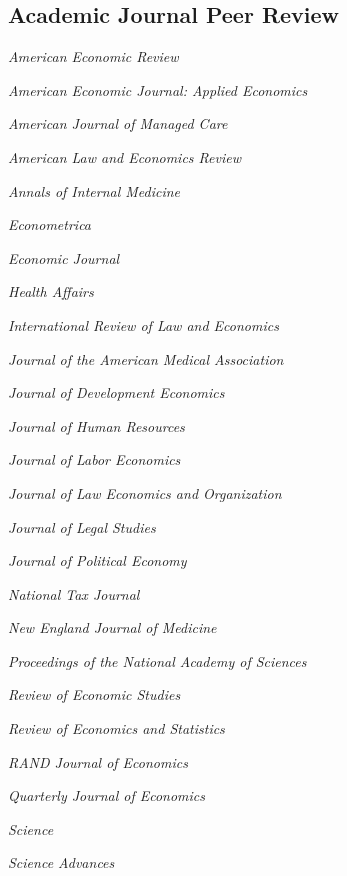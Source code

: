 \documentclass[11pt,letterpaper]{report}
\newcommand{\listitemspace}{0.25em}
\renewenvironment{itemize}
{\begin{list}{}{\setlength{\leftmargin}{0em}
                \setlength{\parskip}{0em}
                \setlength{\itemsep}{\listitemspace}
                \setlength{\parsep}{\listitemspace}}}
{\end{list}}
\begin{document}
    \subsection*{Academic Journal Peer Review}

    \begin{itemize}

        \item \textit{American Economic Review}
        \item \textit{American Economic Journal: Applied Economics}
        \item \textit{American Journal of Managed Care}
        \item \textit{American Law and Economics Review}
        \item \textit{Annals of Internal Medicine}
        \item \textit{Econometrica}
        \item \textit{Economic Journal}
        \item \textit{Health Affairs}
        \item \textit{International Review of Law and Economics}
        \item \textit{Journal of the American Medical Association}
        \item \textit{Journal of Development Economics}
        \item \textit{Journal of Human Resources}
        \item \textit{Journal of Labor Economics}
        \item \textit{Journal of Law Economics and Organization}
        \item \textit{Journal of Legal Studies}
        \item \textit{Journal of Political Economy}
        \item \textit{National Tax Journal}
        \item \textit{New England Journal of Medicine}
        \item \textit{Proceedings of the National Academy of Sciences}
        \item \textit{Review of Economic Studies}
        \item \textit{Review of Economics and Statistics}
        \item \textit{RAND Journal of Economics}
        \item \textit{Quarterly Journal of Economics}
        \item \textit{Science}
        \item \textit{Science Advances}

    \end{itemize}
\end{document}
